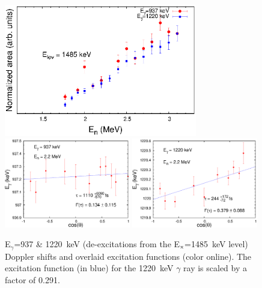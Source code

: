 \begin{figure}[h!]
\begin{center}
\includegraphics[width=0.75\textwidth]{figures/937_ExF.eps}\\
\includegraphics[width=0.49\textwidth]{figures/937_DSAM.eps}
\includegraphics[width=0.49\textwidth]{figures/1220_DSAM.eps}
\caption{E$_\gamma$=937 \& 1220~keV (de-excitations from the E$_{\rm x}$=1485~keV level) Doppler shifts and overlaid excitation functions (color online). The excitation function (in blue) for the 1220~keV $\gamma$ ray is scaled by a factor of 0.291. \label{fig:1485_DSAM_EXF}}
\end{center}
\end{figure}


